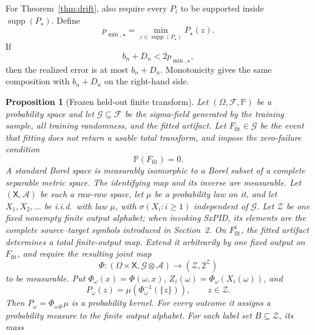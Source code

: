 \documentclass[11pt]{article}
\newtheorem{proposition}[theorem]{Proposition}
\theoremstyle{definition}
\newcommand{\cZ}{\mathcal{Z}}
\newcommand{\Prb}{\mathbb{P}}
\newcommand{\supp}{\operatorname{supp}}
\begin{document}
For Theorem~\ref{thm:drift}, also require every $P_i$ to be supported inside $\supp(P_\star)$.
Define
\begin{equation}
  p_{\min,\star}=\min_{z\in\supp(P_\star)}P_\star(z).
\end{equation}
If
\begin{equation}
  b_n+D_n<2p_{\min,\star},
\end{equation}
then the realized error is at most $b_n+D_n$.  Monotonicity gives the same composition with
$b_n+D_n$ on the right-hand side.

\begin{proposition}[Frozen held-out finite transform]\label{prop:frozen-transform}
Let $(\Omega,\mathcal F,\Prb)$ be a probability space and let
$\mathcal G\subseteq\mathcal F$ be the sigma-field generated by the training sample, all training
randomness, and the fitted artifact.  Let $F_{\mathrm{fit}}\in\mathcal G$ be the event that fitting
does not return a usable total transform, and impose the zero-failure condition
\begin{equation}\label{eq:frozen-zero-failure}
  \Prb(F_{\mathrm{fit}})=0.
\end{equation}
A standard Borel space is measurably isomorphic to a Borel subset of a complete separable
metric space. The identifying map and its inverse are measurable. Let $(\mathsf X,\mathcal A)$
be such a raw-row space, let $\mu$ be a probability law on
it, and let $X_1,X_2,\ldots$ be i.i.d.\ with law $\mu$, with
$\sigma(X_i:i\ge1)$ independent of $\mathcal G$.  Let $\cZ$ be one fixed nonempty finite output
alphabet; when invoking SxPID, its elements are the complete source--target symbols introduced in
Section~2.  On $F_{\mathrm{fit}}^{\mathsf c}$, the fitted artifact determines a total
finite-output map.  Extend it arbitrarily by one fixed output on $F_{\mathrm{fit}}$, and require
the resulting joint map
\begin{equation}\label{eq:frozen-map}
  \Phi:
  (\Omega\times\mathsf X,\mathcal G\otimes\mathcal A)
  \longrightarrow(\cZ,2^{\cZ})
\end{equation}
to be measurable.  Put $\Phi_\omega(x)=\Phi(\omega,x)$,
$Z_i(\omega)=\Phi_\omega(X_i(\omega))$, and
\begin{equation}\label{eq:frozen-pushforward}
  P_\omega(z)
  =
  \mu\!\left(\Phi_\omega^{-1}(\{z\})\right),
  \qquad z\in\cZ.
\end{equation}
Then $P_\omega=\Phi_{\omega\#}\mu$ is a probability kernel. For every outcome it assigns a
probability measure to the finite output alphabet. For each label set $B\subseteq\cZ$, its mass

\end{proposition}
\end{document}
